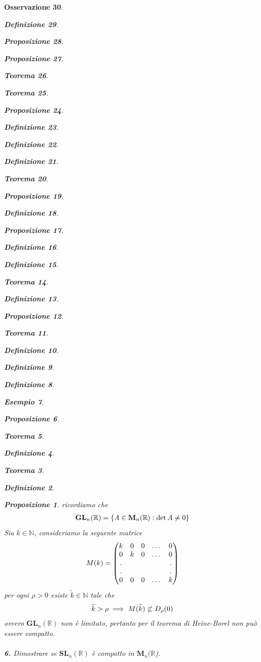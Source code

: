 \documentclass[oneside, 11pt]{amsbook}
\makeatletter
\newcommand{\0}{{(0)}}
\newcommand{\3}{{(3)}}
\theoremstyle{colonplain}
\newtheorem{thm}{Teorema}[chapter]
\newtheorem{prop}[thm]{Proposizione}
\theoremstyle{colondefinition}
\newtheorem{defn}[thm]{Definizione}
\newtheorem{ex}[thm]{Esempio}
\theoremstyle{colonremark}
\newtheorem{rmk}[thm]{Osservazione}
\numberwithin{equation}{chapter}
\renewcommand{\proofname}{Dimostrazione}
\renewenvironment{proof}[1][\proofname]{\par
  \pushQED{\end{proof}}%
  \normalfont \topsep6\p@\@plus6\p@\relax
  \trivlist
  \item[\hskip\labelsep\bfseries #1:]\ignorespaces
}{%
  \popQED\endtrivlist\@endpefalse
}
\makeatother
\begin{document}
\begin{rmk}
\begin{defn}
\begin{prop}
\begin{prop}
\begin{thm}
\begin{thm}
\begin{prop}
\begin{defn}
\begin{defn}
\begin{defn}
\begin{thm}
\begin{prop}
\begin{defn}
\begin{prop}
\begin{defn}
\begin{defn}
\begin{thm}
\begin{defn}
\begin{prop}
\begin{thm}
\begin{defn}
\begin{defn}
\begin{defn}
\begin{ex}
\begin{prop}
\begin{thm}
\begin{defn}
\begin{thm}
\begin{defn}
\begin{prop}
\begin{proof}
\begin{proof}
\begin{proof}
\begin{proof}
\begin{proof}[Soluzione] ricordiamo che
\begin{align}
    \mathbf{GL}_n(\mathbb{R}) = \{ A \in \mathbf{M}_n(\mathbb{R}) : \det A \neq 0 \} \notag
\end{align}
Sia $k \in \mathbb{N}$, consideriamo la seguente matrice
\begin{align}
    M(k) = \begin{pmatrix}
        k & 0 & 0 & \dots & 0 \\
        0 & k & 0 & \dots & 0 \\
        . & & & & . \\
        . & & & & . \\
        0 & 0 & 0 & \dots & k
    \end{pmatrix} \notag
\end{align}
per ogni $\rho > 0$ esiste $\widetilde{k} \in \mathbb{N}$ tale che
\begin{align}
    \widetilde{k} > \rho \implies M(\widetilde{k}) \not\subset D_\rho(0) \notag
\end{align}
ovvero $\mathbf{GL}_n(\mathbb{R})$ non è limitato, pertanto per il \textit{teorema di Heine-Borel} non può essere compatto. \\ \\
\textbf{6.} Dimostrare se $\textbf{SL}_n(\mathbb{R})$ è compatto in $\mathbf{M}_n(\mathbb{R}$). \\


\end{proof}
\end{proof}
\end{proof}
\end{proof}
\end{proof}
\end{prop}
\end{defn}
\end{thm}
\end{defn}
\end{thm}
\end{prop}
\end{ex}
\end{defn}
\end{defn}
\end{defn}
\end{thm}
\end{prop}
\end{defn}
\end{thm}
\end{defn}
\end{defn}
\end{prop}
\end{defn}
\end{prop}
\end{thm}
\end{defn}
\end{defn}
\end{defn}
\end{prop}
\end{thm}
\end{thm}
\end{prop}
\end{prop}
\end{defn}
\end{rmk}
\end{document}
